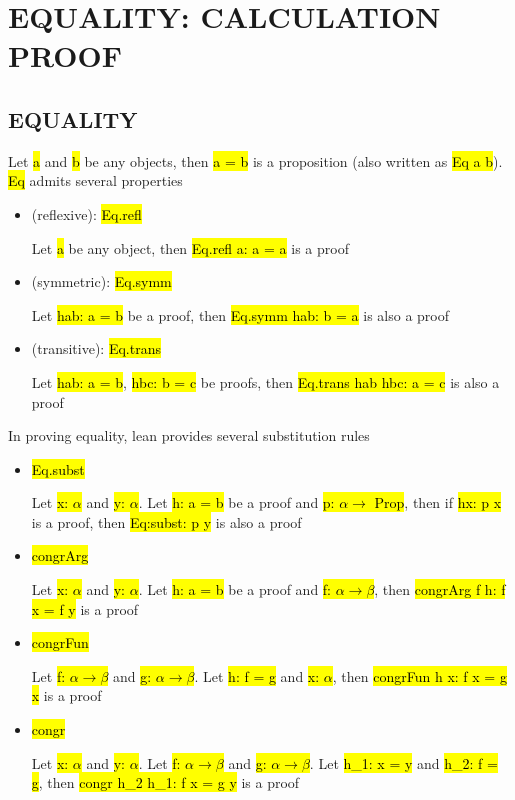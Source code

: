 \chapter{EQUALITY: CALCULATION PROOF}


\section{EQUALITY}


Let \hl{a} and \hl{b} be any objects, then \hl{a = b} is a proposition (also written as \hl{Eq a b}). \hl{Eq} admits several properties

\begin{itemize}
	\item (reflexive): \hl{Eq.refl}
	
	Let \hl{a} be any object, then \hl{Eq.refl a: a = a} is a proof
	
	\item (symmetric): \hl{Eq.symm}
	
	Let \hl{hab: a = b} be a proof, then \hl{Eq.symm hab: b = a} is also a proof
	
	\item (transitive): \hl{Eq.trans}
	
	Let \hl{hab: a = b}, \hl{hbc: b = c} be proofs, then \hl{Eq.trans hab hbc: a = c} is also a proof
\end{itemize}

In proving equality, lean provides several substitution rules

\begin{itemize}
	\item \hl{Eq.subst}
	
	Let \hl{x: $\alpha$} and \hl{y: $\alpha$}. Let \hl{h: a = b} be a proof and \hl{p: $\alpha \to$ Prop}, then if \hl{hx: p x} is a proof, then \hl{Eq:subst: p y} is also a proof
	
	\item \hl{congrArg}
	
	Let \hl{x: $\alpha$} and \hl{y: $\alpha$}. Let \hl{h: a = b} be a proof and \hl{f: $\alpha \to \beta$}, then \hl{congrArg f h: f x = f y} is a proof
	
	\item \hl{congrFun}
	
	Let \hl{f: $\alpha \to \beta$} and \hl{g: $\alpha \to \beta$}. Let \hl{h: f = g} and \hl{x: $\alpha$}, then \hl{congrFun h x: f x = g x} is a proof
	
	\item \hl{congr}
	
	Let \hl{x: $\alpha$} and \hl{y: $\alpha$}. Let \hl{f: $\alpha \to \beta$} and \hl{g: $\alpha \to \beta$}. Let \hl{h\_1: x = y} and \hl{h\_2: f = g}, then \hl{congr h\_2 h\_1: f x = g y} is a proof
\end{itemize}

